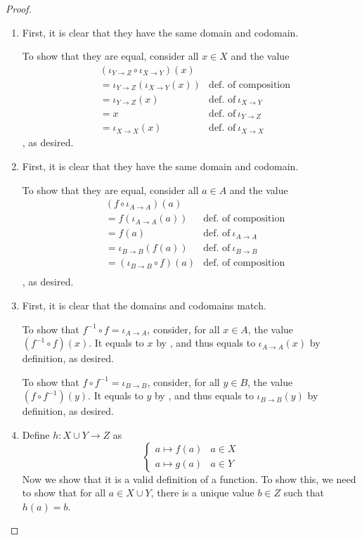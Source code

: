 \begin{proof}\leavevmode
	\begin{enumerate}
		\item First, it is clear that they have the same domain and codomain.
		
		To show that they are equal, consider all $x \in X$ and the value 
		\begin{align*}
			&(\iota_{Y \to Z} \circ \iota_{X \to Y})(x) \\
			&= \iota_{Y \to Z}(\iota_{X \to Y}(x)) 		&\text{def.~of composition}\\
			&= \iota_{Y \to Z}(x) 						&\text{def.~of}\ \iota_{X \to Y}\\
			&= x 										&\text{def.~of}\ \iota_{Y \to Z}\\
			&= \iota_{X \to X}(x)						&\text{def.~of}\ \iota_{X \to X}
		\end{align*}
		, as desired.
		
		\item First, it is clear that they have the same domain and codomain.
		
		To show that they are equal, consider all $a \in A$ and the value
		\begin{align*}
			&(f \circ \iota_{A \to A})(a) \\
			&= f(\iota_{A \to A}(a)) 		&\text{def.~of composition}\\
			&= f(a) 						&\text{def.~of}\ \iota_{A \to A}\\
			&= \iota_{B \to B}(f(a))		&\text{def.~of}\ \iota_{B \to B}\\
			&= (\iota_{B \to B} \circ f)(a)	&\text{def.~of composition}\\
		\end{align*}
		, as desired.
		
		\item First, it is clear that the domains and codomains match.
		
		To show that $f^{-1} \circ f = \iota_{A \to A}$, consider, for all $x \in A$, the value $(f^{-1} \circ f)(x)$. It equals to $x$ by , and thus equals to $\iota_{A \to A}(x)$ by definition, as desired.
		
		To show that $f \circ f^{-1} = \iota_{B \to B}$, consider, for all $y \in B$, the value $(f \circ f^{-1})(y)$. It equals to $y$ by , and thus equals to $\iota_{B \to B}(y)$ by definition, as desired.
		
		\item {} Define $h: X \cup Y \to Z$ as
		\[
		\begin{cases}
			a \mapsto f(a) &a \in X \\
			a \mapsto g(a) &a \in Y
		\end{cases}
		\]
		Now we show that it is a valid definition of a function. To show this, we need to show that for all $a \in X \cup Y$, there is a unique value $b \in Z$ such that $h(a) = b$.
		

\end{enumerate}
\end{proof}
